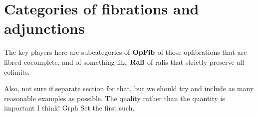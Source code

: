\documentclass{amsart}
\begin{document}
\section{Categories of fibrations and adjunctions}

The key players here are subcategories of $\mathbf{OpFib}$ of those opfibrations that are fibred cocomplete, and of something like
$\mathbf{Rali}$ of ralis that strictly preserve all colimits.

{\chris Also, not sure if separate section for that, but we should try and include as many reasonable examples as possible. The quality rather
than the quantity is important I think! Grph Set the first such.}



\end{document}

